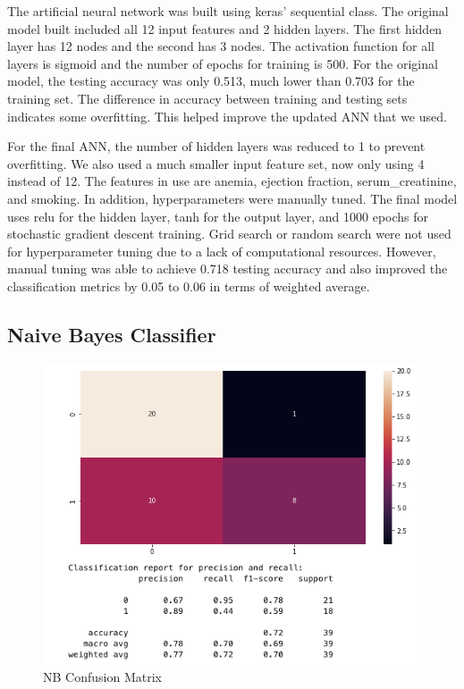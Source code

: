 \documentclass[11pt]{article}
\begin{document}
{The artificial neural network was built using keras' sequential class.
The original model built included all 12 input features and 2 hidden
layers. The first hidden layer has 12 nodes and the second has 3 nodes.
The activation function for all layers is sigmoid and the number of
epochs for training is 500. For the original model, the testing accuracy
was only 0.513, much lower than 0.703 for the training set. The
difference in accuracy between training and testing sets indicates some
overfitting. This helped improve the updated ANN that we used.}

{}

{For the final ANN, the number of hidden layers was reduced to 1 to
prevent overfitting. We also used a much smaller input feature set, now
only using 4 instead of 12. The features in use are anemia, ejection
fraction, serum\_creatinine, and smoking. In addition, hyperparameters
were manually tuned. The final model uses relu for the hidden layer,
tanh for the output layer, and 1000 epochs for stochastic gradient
descent training. Grid search or random search were not used for
hyperparameter tuning due to a lack of computational resources. However,
manual tuning was able to achieve 0.718 testing accuracy and also
improved the classification metrics by 0.05 to 0.06 in terms of weighted
average. }

{}

\subsection{Naive Bayes Classifier}

\begin{figure}[H]
	\centering
	\includegraphics[width=7.5in]{figures/nb_confusion.png}
	\caption{NB Confusion Matrix}\label{fig:figures/nb_confusion.png}
\end{figure}
\end{document}
